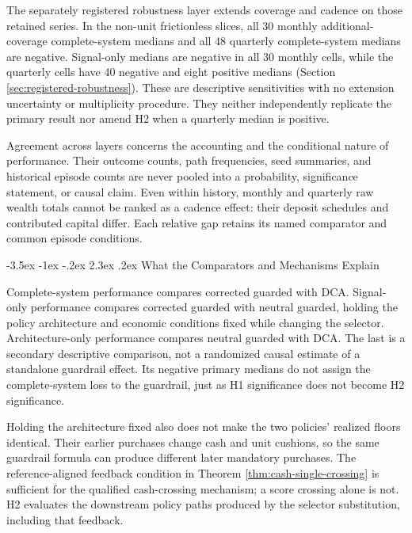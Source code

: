 \documentclass[12pt,a4paper,oneside]{report}
\makeatletter
\renewcommand\section{\@startsection{section}{1}{\z@}%
  {-3.5ex \@plus -1ex \@minus -.2ex}%
  {2.3ex \@plus .2ex}%
  {\normalfont\fontsize{14}{17}\selectfont\bfseries}}
\makeatother
\begin{document}
The separately registered robustness layer extends coverage and cadence on
those retained series. In the non-unit frictionless slices, all 30 monthly
additional-coverage complete-system medians and all 48 quarterly
complete-system medians are negative. Signal-only
medians are negative in all 30 monthly cells, while the quarterly cells have
40 negative and eight positive medians (Section
\ref{sec:registered-robustness}). These are descriptive sensitivities with no
extension uncertainty or multiplicity procedure. They neither independently
replicate the primary result nor amend H2 when a quarterly median is positive.

Agreement across layers concerns the accounting and the conditional nature of
performance. Their outcome counts, path frequencies, seed summaries, and
historical episode counts are never pooled into a probability, significance
statement, or causal claim. Even within history, monthly and quarterly raw
wealth totals cannot be ranked as a cadence effect: their deposit schedules
and contributed capital differ. Each relative gap retains its named comparator
and common episode conditions.

\section{What the Comparators and Mechanisms Explain}
\label{sec:discussion-mechanisms}

Complete-system performance compares corrected guarded with DCA. Signal-only
performance compares corrected guarded with neutral guarded, holding the
policy architecture and economic conditions fixed while changing the selector.
Architecture-only performance compares neutral guarded with DCA. The last is a
secondary descriptive comparison, not a randomized causal estimate of a
standalone guardrail effect. Its negative primary medians do not assign the
complete-system loss to the guardrail, just as H1 significance does not become
H2 significance.

Holding the architecture fixed also does not make the two policies' realized
floors identical. Their earlier purchases change cash and unit cushions, so
the same guardrail formula can produce different later mandatory purchases.
The reference-aligned feedback condition in Theorem
\ref{thm:cash-single-crossing} is sufficient for the qualified cash-crossing
mechanism; a score crossing alone is not. H2 evaluates the downstream policy
paths produced by the selector substitution, including that feedback.
\end{document}
